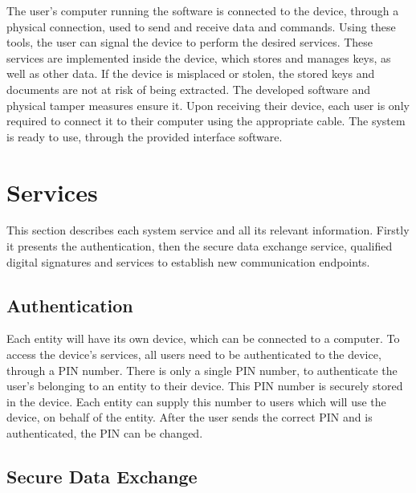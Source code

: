 The user's computer running the software is connected to the device, through a physical connection, used to send and receive data and commands.
Using these tools, the user can signal the device to perform the desired services.
These services are implemented inside the device, which stores and manages keys, as well as other data.
If the device is misplaced or stolen, the stored keys and documents are not at risk of being extracted. The developed software and physical tamper measures ensure it.
Upon receiving their device, each user is only required to connect it to their computer using the appropriate cable. The system is ready to use, through the provided interface software.

\section{Services}\label{chap:arch:services}

This section describes each system service and all its relevant information. 
Firstly it presents the authentication, then the secure data exchange service, qualified digital signatures and services to establish new communication endpoints.

\subsection{Authentication}\label{chap:arch:services:auth}

Each entity will have its own device, which can be connected to a computer. To access the device's services, all users need to be authenticated to the device, through a PIN number. There is only a single PIN number, to authenticate the user's belonging to an entity to their device. This PIN number is securely stored in the device.
Each entity can supply this number to users which will use the device, on behalf of the entity.
After the user sends the correct PIN and is authenticated, the PIN can be changed.

\subsection{Secure Data Exchange}\label{chap:arch:services:data-exchange}

